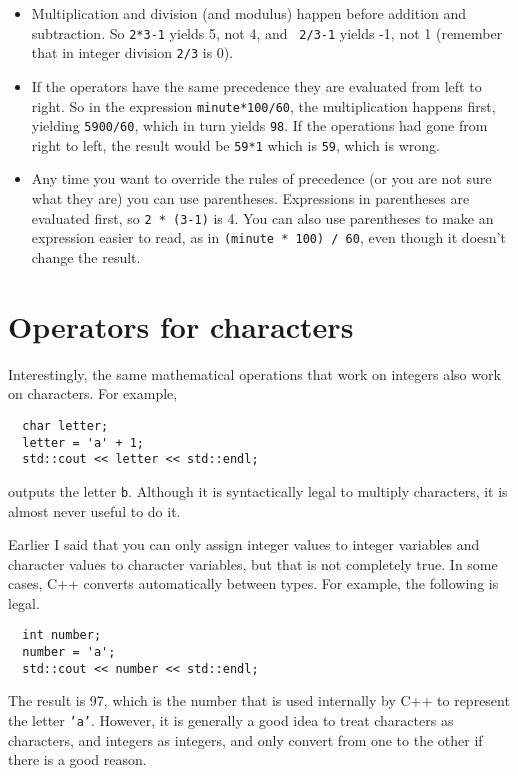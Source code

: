 \begin{itemize}

\item Multiplication and division (and modulus) happen before
addition and subtraction.  So {\tt 2*3-1} yields 5, not 4, and {\tt
2/3-1} yields -1, not 1 (remember that in integer division {\tt 2/3}
is 0).

\item If the operators have the same precedence they are evaluated
from left to right.  So in the expression {\tt minute*100/60},
the multiplication happens first, yielding {\tt 5900/60}, which
in turn yields {\tt 98}.  If the operations had gone from right
to left, the result would be {\tt 59*1} which is {\tt 59}, which
is wrong.

\item Any time you want to override the rules of precedence (or
you are not sure what they are) you can use parentheses.  Expressions
in parentheses are evaluated first, so {\tt 2 * (3-1)} is 4.
You can also use parentheses to make an expression easier to
read, as in {\tt (minute * 100) / 60}, even though it doesn't
change the result.

\end{itemize}

\section{Operators for characters}

Interestingly, the same mathematical operations that work on
integers also work on characters.  For example,

\begin{lstlisting}
  char letter;
  letter = 'a' + 1;
  std::cout << letter << std::endl;
\end{lstlisting}
%
outputs the letter {\tt b}.  Although it is syntactically legal
to multiply characters, it is almost never useful to do it.

Earlier I said that you can only assign integer values to
integer variables and character values to character variables,
but that is not completely true.  In some cases, C++ converts
automatically between types.  For example, the following is
legal.

\begin{lstlisting}
  int number;
  number = 'a';
  std::cout << number << std::endl;
\end{lstlisting}
%
The result is 97, which is the number that is used internally
by C++ to represent the letter {\tt 'a'}.  However, it is
generally a good idea to treat characters as characters, and
integers as integers, and only convert from one to the other
if there is a good reason.

